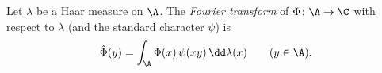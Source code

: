 Let $\lambda$ be a Haar measure on $\A$. The \emph{Fourier transform} of $\Phi\colon\A\to\C$ with respect to $\lambda$
(and the standard character $\psi$) is
\[
  \hat\Phi(y)=\int_\A\Phi(x)\,\psi(xy)\,\dd\lambda(x)\qquad(y\in\A).
\]
